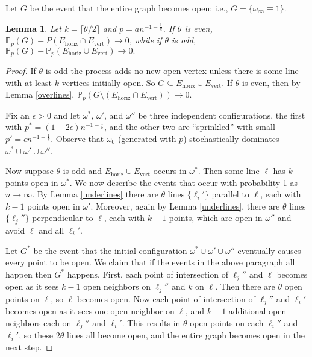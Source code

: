 \documentclass{amsart}
\newcommand{\prob}{\mathbb{P}}
\newcommand{\threshold}{\theta}
\newcommand{\vertical}{\text{vert}}
\newcommand{\horizontal}{\text{horiz}}
\numberwithin{equation}{section}
\newtheorem{lemma}[theorem]{Lemma}
\theoremstyle{definition}
\theoremstyle{remark}
\begin{document}
Let $G$ be the event that the entire graph becomes open; i.e., $G = \{\omega_\infty\equiv 1\}$.
\begin{lemma} \label{events}
Let $k = \lceil \threshold/2\rceil$ and $p = a n^{-1-\frac{1}{k}}$.  If $\threshold$ is even, $\prob_p(G)-P(E_{\horizontal} \cap E_{\vertical}) \to 0$, while if $\threshold$ is odd,
$\prob_p(G)- \prob_p(E_{\horizontal} \cup E_{\vertical}) \to 0.$
\end{lemma}

\begin{proof}
If $\threshold$ is odd the process adds no new open vertex unless there is some line with at least $k$ vertices initially open. So $G \subseteq E_{\horizontal} \cup E_{\vertical}$.
If $\threshold$ is even, then by Lemma \ref{overlines}, 
$\prob_p(G \setminus (E_{\horizontal} \cap E_{\vertical})) \to 0$.

Fix an $\epsilon>0$ and let $\omega^*$, $\omega'$, and $\omega''$ be three
independent configurations, the first with $p^*=(1-2\epsilon) n^{-1-\frac 1k}$, and 
the other two are ``sprinkled'' 
with small $p'=\epsilon n^{-1-\frac 1k}$. Observe that $\omega_0$ (generated with $p$) stochastically 
dominates $\omega^*\cup\omega'\cup\omega''$. 

Now suppose $\threshold$ is odd and $E_{\horizontal} \cup E_{\vertical}$ occurs in $\omega^*$. 
Then some line $\ell$ has $k$ points open in $\omega^*$.
We now describe the events that occur with probability 1 as $n\to\infty$. 
By Lemma \ref{underlines} 
there are $\threshold$ lines $\{\ell_i'\}$ parallel to $\ell$, each with $k-1$ 
points open in $\omega'$. 
Moreover, again by Lemma \ref{underlines}, there are $\threshold$ lines $\{\ell_j''\}$ 
perpendicular to $\ell$, 
each with $k-1$ points, which are open in $\omega''$ and avoid $\ell$ and all 
$\ell_i'$.

Let $G^*$ be the event that the initial configuration 
$\omega^*\cup\omega'\cup\omega''$ eventually causes every point to be open.
We claim that if the events in the above paragraph all happen then $G^*$ happens. 
First, each point of intersection of $\ell_j''$ and $\ell$ becomes open as it sees
$k-1$ open neighbors on $\ell_j''$ and $k$ on $\ell$. Then there are $\threshold$ open points on 
$\ell$, so $\ell$ becomes open.
Now each point of intersection of $\ell_j''$ and $\ell_i'$ becomes open as it 
sees one open neighbor on $\ell$, and $k-1$ additional 
open neighbors each on $\ell_j''$ and $\ell_i'$. 
This results in  $\threshold$ open points on each $\ell_i''$ and $\ell_i'$, so 
these $2\threshold$ lines all become open, and the entire graph becomes open in the next step.


\end{proof}
\end{document}
